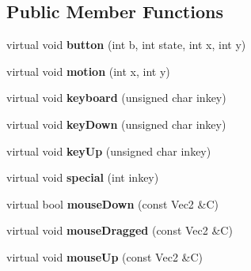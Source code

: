 \subsection*{Public Member Functions}
\begin{DoxyCompactItemize}
\item 
\hypertarget{classg2c_1_1_listener_a2b8deaae3e27f36501bae72316c4fe5c}{
virtual void {\bfseries button} (int b, int state, int x, int y)}
\label{classg2c_1_1_listener_a2b8deaae3e27f36501bae72316c4fe5c}

\item 
\hypertarget{classg2c_1_1_listener_a695fe884b88bb4afcad41802c55ca49e}{
virtual void {\bfseries motion} (int x, int y)}
\label{classg2c_1_1_listener_a695fe884b88bb4afcad41802c55ca49e}

\item 
\hypertarget{classg2c_1_1_listener_a82db635c29eb103d54b2d6ac1fb54389}{
virtual void {\bfseries keyboard} (unsigned char inkey)}
\label{classg2c_1_1_listener_a82db635c29eb103d54b2d6ac1fb54389}

\item 
\hypertarget{classg2c_1_1_listener_a97fe3ed3dd652d7baa239f820f7719f1}{
virtual void {\bfseries keyDown} (unsigned char inkey)}
\label{classg2c_1_1_listener_a97fe3ed3dd652d7baa239f820f7719f1}

\item 
\hypertarget{classg2c_1_1_listener_a96ca8c3605e864048cd96211aec3f69e}{
virtual void {\bfseries keyUp} (unsigned char inkey)}
\label{classg2c_1_1_listener_a96ca8c3605e864048cd96211aec3f69e}

\item 
\hypertarget{classg2c_1_1_listener_ad8a5887401ecfe2b0e4c060e86cf103b}{
virtual void {\bfseries special} (int inkey)}
\label{classg2c_1_1_listener_ad8a5887401ecfe2b0e4c060e86cf103b}

\item 
\hypertarget{classg2c_1_1_listener_a9a7c4697f273982b42f9975787ffb573}{
virtual bool {\bfseries mouseDown} (const Vec2 \&C)}
\label{classg2c_1_1_listener_a9a7c4697f273982b42f9975787ffb573}

\item 
\hypertarget{classg2c_1_1_listener_a581f3f2111d62e9e05ddeb8e731b6373}{
virtual void {\bfseries mouseDragged} (const Vec2 \&C)}
\label{classg2c_1_1_listener_a581f3f2111d62e9e05ddeb8e731b6373}

\item 
\hypertarget{classg2c_1_1_listener_aeb3f29741fb750b8ea2487ec6f018f41}{
virtual void {\bfseries mouseUp} (const Vec2 \&C)}
\label{classg2c_1_1_listener_aeb3f29741fb750b8ea2487ec6f018f41}

\end{DoxyCompactItemize}
